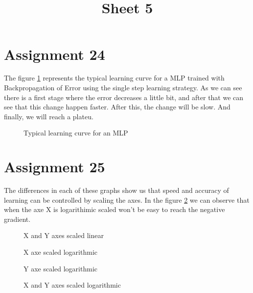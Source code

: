 \documentclass[12pt]{article}
\begin{document}
 
\title{Sheet 5} 
\maketitle

\section{Assignment 24}

The figure \ref{fig:learning} represents the typical learning curve for a MLP
trained with Backpropagation of Error using the single step learning strategy.
As we can see there is a first stage where the error decreases a little bit,
and after that we can see that this change happen faster. After this, the
change will be slow. And finally, we will reach a plateu.

\begin{figure}[h]
    \centering
    
    \caption{Typical learning curve for an MLP}
    \label{fig:learning}
\end{figure}

\section{Assignment 25}

The differences in each of these graphs show us that speed and accuracy of
learning can be controlled by scaling the axes. In the figure \ref{fig:b} we
can observe that when the axe X is logarithimic scaled won't be easy to reach 
the negative gradient. 

\begin{figure}[p]

        \centering
        
        \caption{X and Y axes scaled linear}
        \label{fig:a}

        
        \caption{X axe scaled logarithmic }
        \label{fig:b}

\end{figure}

\begin{figure}[p]

        \centering
        
        \caption{Y axe scaled logarithmic }
        \label{fig:c}

        
        \caption{X and Y axes scaled logarithmic }
        \label{fig:d}

\end{figure}
\end{document}
